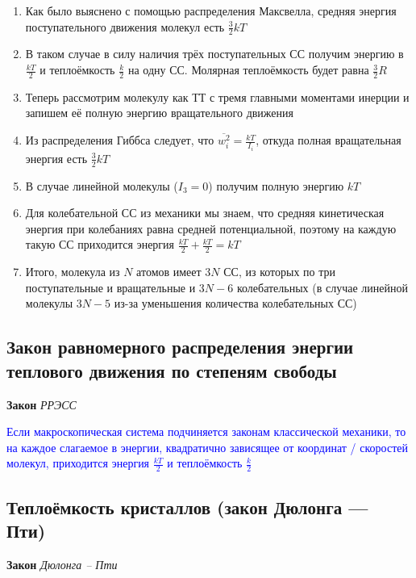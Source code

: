 \documentclass[a4paper, 14pt]{article}
\begin{document}
    \begin{enumerate}
        \item Как было выяснено с помощью распределения Максвелла, средняя энергия поступательного движения молекул
        есть $\frac{3}{2} kT$
        \item В таком случае в силу наличия трёх поступательных СС получим энергию в $\frac{kT}{2}$ и теплоёмкость
        $\frac{k}{2}$ на одну СС.
        Молярная теплоёмкость будет равна $\frac{3}{2}R$
        \item Теперь рассмотрим молекулу как ТТ с тремя главными моментами инерции и запишем её полную энергию
        вращательного движения
        \item Из распределения Гиббса следует, что $\overline{w^2_i} = \frac{kT}{I_i}$, откуда полная вращательная
        энергия есть $\frac{3}{2} kT$
        \item В случае линейной молекулы ($I_3 = 0$) получим полную энергию $kT$
        \item Для колебательной СС из механики мы знаем, что средняя кинетическая энергия при колебаниях равна
        средней потенциальной, поэтому на каждую такую СС приходится энергия $\frac{kT}{2} + \frac{kT}{2} = kT$
        \item Итого, молекула из $N$ атомов имеет $3N$ СС, из которых по три поступательные и вращательные и $3N - 6$
        колебательных (в случае линейной молекулы $3N - 5$ из-за уменьшения количества колебательных СС)
    \end{enumerate}
    
    \subsection{Закон равномерного распределения энергии теплового движения по степеням свободы}
    
    \textbf{Закон} \textit{РРЭСС}
    
    \textcolor{blue}{Если макроскопическая система подчиняется законам классической механики, то на каждое слагаемое
    в энергии, квадратично зависящее от координат / скоростей молекул, приходится энергия $\frac{kT}{2}$ и
    теплоёмкость $\frac{k}{2}$}
    
    \subsection{Теплоёмкость кристаллов (закон Дюлонга — Пти)}
    
    \textbf{Закон} \textit{Дюлонга -- Пти}
    
\end{document}
